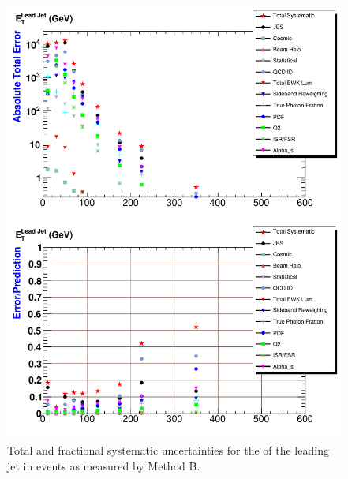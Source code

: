 \begin{figure}[p]
 \centering
 \includegraphics[scale=.7,keepaspectratio=true]{./G30Jets_Errs_MtdB_plot1_Et_j1.pdf}
 \caption{Total and fractional systematic uncertainties for the \et of the leading jet in \phoonejet events as measured by Method B.}
 \label{fig:g30Jets_Errs_MtdB_plot1_Et_jet}
\end{figure}


